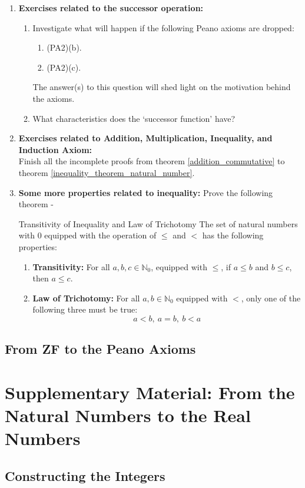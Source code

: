 \begin{enumerate}[label=\textbf{\arabic*.}]
	\item \textbf{Exercises related to the successor operation:}
	\begin{enumerate}
		\item Investigate what will happen if the following Peano axioms are dropped:
		\begin{enumerate}
			\item (PA2)(b).
			\item (PA2)(c).
		\end{enumerate}
		The answer(s) to this question will shed light on the motivation behind the axioms.
		\item What characteristics does the `successor function' have?
	\end{enumerate}
	\item \textbf{Exercises related to Addition, Multiplication, Inequality, and Induction Axiom:}\\
	Finish all the incomplete proofs from theorem \eqref{addition_commutative} to theorem \eqref{inequality_theorem_natural_number}.
	\item \textbf{Some more properties related to inequality:} Prove the following theorem -
	\begin{Theorem}{Transitivity of Inequality and Law of Trichotomy}\label{transitivity_of_inequality_and_law_of_trichotomy}
		The set of natural numbers with $0$ equipped with the operation of $\leq$ and $<$ has the following properties:
		\begin{enumerate}
			\item \textbf{Transitivity:} For all $a,b,c\in\mathbb{N}_0$, equipped with $\leq$, if $a\leq b$ and $b\leq c$, then $a\leq c$.
			\item \textbf{Law of Trichotomy:} For all $a,b\in\mathbb{N}_0$ equipped with $<$, only one of the following three must be true: $$a< b,\ a=b,\ b< a$$
		\end{enumerate}
	\end{Theorem}
\end{enumerate}
\subsection{From ZF to the Peano Axioms}
\section{Supplementary Material: From the Natural Numbers to the Real Numbers}
\subsection{Constructing the Integers}
